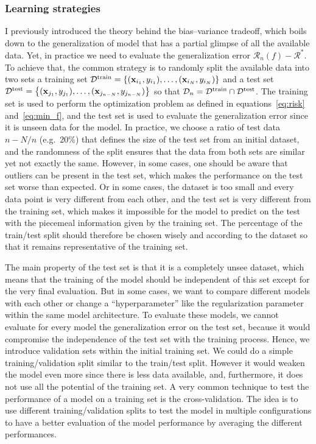 \documentclass[main]{subfiles}
\begin{document}
\subsubsection{Learning strategies}

I previously introduced the theory behind the bias--variance tradeoff, which boils down to the generalization of model that has a partial glimpse of all the available data. Yet, in practice we need to evaluate the generalization error $\mathcal{R}_n(f)-\mathcal{R}^*$. To achieve that, the common strategy is to randomly split the available data into two sets a training set $\mathcal{D}^{\text{train}}=\left\{{(\mathbf{x}_{i_1},y_{i_1}),\ldots,(\mathbf{x}_{i_N},y_{i_N})}\right\}$ and a test set $\mathcal{D}^{\text{test}}=\left\{(\mathbf{x}_{j_1},y_{j_1}),\ldots,(\mathbf{x}_{j_{n-N}},y_{j_{n-N}})\right\}$ so that $\mathcal{D}_n = \mathcal{D}^{\text{train}} \cap \mathcal{D}^{\text{test}}$. The training set is used to perform the optimization problem as defined in equations~\ref{eq:risk} and~\ref{eq:min_f}, and the test set is used to evaluate the generalization error since it is unseen data for the model. In practice, we choose a ratio of test data $n-N/n$ (e.g.\ {20\%}) that defines the size of the test set from an initial dataset, and the randomness of the split ensures that the data from both sets are similar yet not exactly the same. However, in some cases, one should be aware that outliers can be present in the test set, which makes the performance on the test set worse than expected. Or in some cases, the dataset is too small and every data point is very different from each other, and the test set is very different from the training set, which makes it impossible for the model to predict on the test with the piecemeal information given by the training set. The percentage of the train/test split should therefore be chosen wisely and according to the dataset so that it remains representative of the training set.

The main property of the test set is that it is a completely unsee dataset, which means that the training of the model should be independent of this set except for the very final evaluation. But in some cases, we want to compare different models with each other or change a ``hyperparameter'' like the regularization parameter within the same model architecture. To evaluate these models, we cannot evaluate for every model the generalization error on the test set, because it would compromise the independence of the test set with the training process. Hence, we introduce validation sets within the initial training set. We could do a simple training/validation split similar to the train/test split. However it would weaken the model even more since there is less data available, and, furthermore, it does not use all the potential of the training set. A very common technique to test the performance of a model on a training set is the cross-validation. The idea is to use different training/validation splits to test the model in multiple configurations to have a better evaluation of the model performance by averaging the different performances. 
\end{document}
